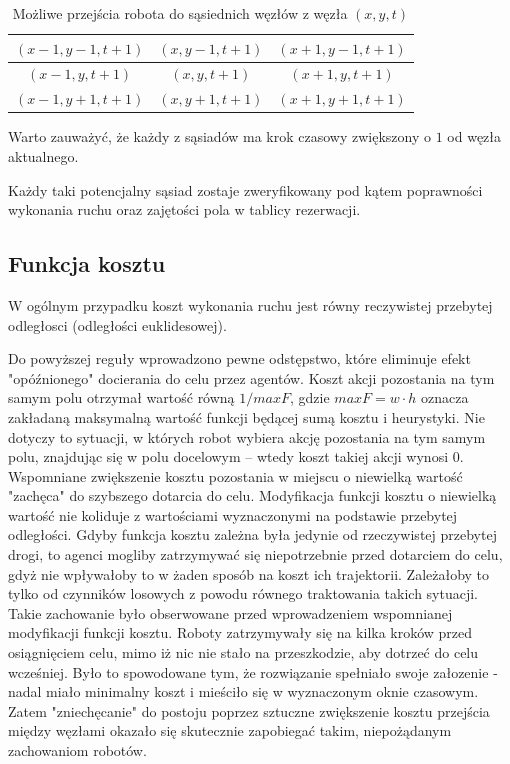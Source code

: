 \begin{table}[H]
\caption{Możliwe przejścia robota do sąsiednich węzłów z węzła $(x, y, t)$} \label{tab:node-neighbours} 
\centering
\begin{tabular}{| c | c | c |}
\hline
$(x-1, y-1, t+1)$ & $(x, y-1, t+1)$ & $(x+1, y-1, t+1)$ \\ \hline
$(x-1, y, t+1)$   & $(x, y, t+1)$   & $(x+1, y, t+1)$   \\ \hline
$(x-1, y+1, t+1)$ & $(x, y+1, t+1)$ & $(x+1, y+1, t+1)$ \\ \hline
\end{tabular}
\end{table}
Warto zauważyć, że każdy z sąsiadów ma krok czasowy zwiększony o $1$ od węzła aktualnego.

Każdy taki potencjalny sąsiad zostaje zweryfikowany pod kątem poprawności wykonania ruchu oraz zajętości pola w tablicy rezerwacji.

\subsection{Funkcja kosztu}
W ogólnym przypadku koszt wykonania ruchu jest równy reczywistej przebytej odległosci (odległości euklidesowej).

Do powyższej reguły wprowadzono pewne odstępstwo, które eliminuje efekt "opóźnionego" docierania do celu przez agentów.
Koszt akcji pozostania na tym samym polu otrzymał wartość równą $1 / maxF$, gdzie $maxF = w \cdot h$ oznacza zakładaną maksymalną wartość funkcji będącej sumą kosztu i heurystyki.
Nie dotyczy to sytuacji, w których robot wybiera akcję pozostania na tym samym polu, znajdując się w polu docelowym -- wtedy koszt takiej akcji wynosi 0.
Wspomniane zwiększenie kosztu pozostania w miejscu o niewielką wartość "zachęca" do szybszego dotarcia do celu.
Modyfikacja funkcji kosztu o niewielką wartość nie koliduje z wartościami wyznaczonymi na podstawie przebytej odległości.
Gdyby funkcja kosztu zależna była jedynie od rzeczywistej przebytej drogi, to agenci mogliby zatrzymywać się niepotrzebnie przed dotarciem do celu, gdyż nie wpływałoby to w żaden sposób na koszt ich trajektorii. Zależałoby to tylko od czynników losowych z powodu równego traktowania takich sytuacji.
Takie zachowanie było obserwowane przed wprowadzeniem wspomnianej modyfikacji funkcji kosztu.
Roboty zatrzymywały się na kilka kroków przed osiągnięciem celu, mimo iż nic nie stało na przeszkodzie, aby dotrzeć do celu wcześniej. Było to spowodowane tym, że rozwiązanie spełniało swoje załozenie - nadal miało minimalny koszt i mieściło się w wyznaczonym oknie czasowym.
Zatem "zniechęcanie" do postoju poprzez sztuczne zwiększenie kosztu przejścia między węzłami okazało się skutecznie zapobiegać takim, niepożądanym zachowaniom robotów.

